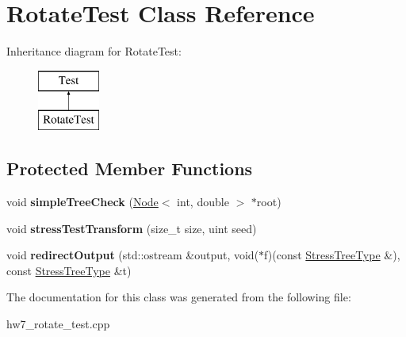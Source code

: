 \hypertarget{classRotateTest}{}\section{Rotate\+Test Class Reference}
\label{classRotateTest}
Inheritance diagram for Rotate\+Test\+:\begin{figure}[H]
\begin{center}
\leavevmode
\includegraphics[height=2.000000cm]{classRotateTest}
\end{center}
\end{figure}
\subsection*{Protected Member Functions}
\begin{DoxyCompactItemize}
\item 
\mbox{\label{classRotateTest_abf79269986c4d0167a7012c5d6a06334}} 
void {\bfseries simple\+Tree\+Check} (\mbox{\hyperlink{classNode}{Node}}$<$ int, double $>$ $\ast$root)
\item 
\mbox{\label{classRotateTest_a1dd78b04588e2773d0c607d91593a9dd}} 
void {\bfseries stress\+Test\+Transform} (size\+\_\+t size, uint seed)
\item 
\mbox{\label{classRotateTest_aad9a3080c84acf121fde68d2392653b4}} 
void {\bfseries redirect\+Output} (std\+::ostream \&output, void($\ast$f)(const \mbox{\hyperlink{classInheritedRotate}{Stress\+Tree\+Type}} \&), const \mbox{\hyperlink{classInheritedRotate}{Stress\+Tree\+Type}} \&t)
\end{DoxyCompactItemize}


The documentation for this class was generated from the following file\+:\begin{DoxyCompactItemize}
\item 
hw7\+\_\+rotate\+\_\+test.\+cpp\end{DoxyCompactItemize}

